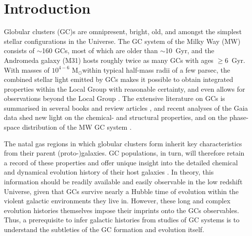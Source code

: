 \documentclass[a4paper,fleqn,usenatbib]{mnras}
\newcommand{\Sun}[0]{\ensuremath{_{\odot}}}
\begin{document}
\section{Introduction}
Globular clusters (GC)s are omnipresent, bright, old, and amongst the simplest
stellar configurations in the Universe. The GC system of the Milky Way (MW) consists
of $\sim$160 GCs, most of which are older than $\sim$10~Gyr, and the Andromeda 
galaxy (M31) hosts roughly twice as many GCs with ages $\geq 6$~Gyr. With masses of 
$10^{4-6}$ M\Sun within typical half-mass radii of a few parsec, the combined stellar 
light emitted by GCs makes it possible to obtain integrated properties within the Local
Group with reasonable certainty, and even allows for observations beyond the Local Group 
\citep[e.g.][]{1991ARA&A..29..543H}. The extensive literature on GCs is summarised in
several books and review articles \citep[e.g.][]{Harris2001, 2004Natur.427...31W, 
2006ARA&A..44..193B, 2012A&ARv..20...50G, 2014CQGra..31x4006K, 2018RSPSA.47470616F}, and
recent analyses of the Gaia data shed new light on the chemical- and structural properties,
and on the phase-space distribution of the MW GC system \citep[e.g.][]{2018A&A...616A..12G, 
2018ApJ...859L..13B, 2019A&A...621A..56P, 2019MNRAS.484.2832V}. 

The natal gas regions in which globular clusters form inherit key characteristics 
from their parent (proto-)galaxies. GC populations, in turn, will therefore retain 
a record of these properties and offer unique insight into the detailed chemical 
and dynamical evolution history of their host galaxies \citep[see][for a recent review]
{2006ARA&A..44..193B}. In theory, this information should be readily available
and easily observable in the low redshift Universe, given that GCs survive nearly
a Hubble time of evolution within the violent galactic environments they live in. 
However, these long and complex evolution histories themselves impose their
imprints onto the GCs observables. Thus, a prerequisite to infer galactic histories
from studies of GC systems is to understand the subtleties of the GC formation
and evolution itself.
\end{document}
